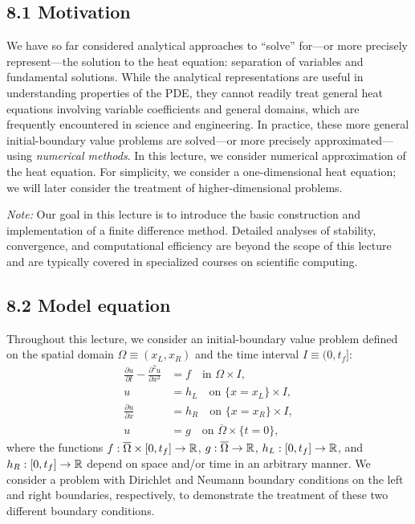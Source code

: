 
\providecommand{\uu}{\tilde{\tilde{u}}}
\providecommand{\fh}{\tilde{\hat{f}}}
\providecommand{\hh}{\tilde{\hat{h}}}


\subsection{8.1 Motivation}
We have so far considered analytical approaches to ``solve'' for---or more precisely represent---the solution to the heat equation: separation of variables and fundamental solutions. While the analytical representations are useful in understanding properties of the PDE, they cannot readily treat general heat equations involving variable coefficients and general domains, which are frequently encountered in science and engineering. In practice, these more general initial-boundary value problems are solved---or more precisely approximated---using \textit{numerical methods}. In this lecture, we consider numerical approximation of the heat equation. For simplicity, we consider a one-dimensional heat equation; we will later consider the treatment of higher-dimensional problems.

\textit{Note:} Our goal in this lecture is to introduce the basic construction and implementation of a finite difference method. Detailed analyses of stability, convergence, and computational efficiency are beyond the scope of this lecture and are typically covered in specialized courses on scientific computing.

\subsection{8.2 Model equation}
Throughout this lecture, we consider an initial-boundary value problem defined on the spatial domain $\Omega \equiv (x_L, x_R)$ and the time interval $I \equiv (0, t_f]$:
\begin{align*}
    \frac{\partial u}{\partial t} - \frac{\partial^2 u}{\partial x^2} &= f \quad \text{in } \Omega \times I, \\
    u &= h_L \quad \text{on } \{x = x_L\} \times I, \\
    \frac{\partial u}{\partial x} &= h_R \quad \text{on } \{x = x_R\} \times I, \\
    u &= g \quad \text{on } \overline{\Omega} \times \{t = 0\},
\end{align*}
where the functions $f : \overline{\Omega} \times [0, t_f] \to \mathbb{R}$, $g : \overline{\Omega} \to \mathbb{R}$, $h_L : [0, t_f] \to \mathbb{R}$, and $h_R : [0, t_f] \to \mathbb{R}$ depend on space and/or time in an arbitrary manner. We consider a problem with Dirichlet and Neumann boundary conditions on the left and right boundaries, respectively, to demonstrate the treatment of these two different boundary conditions.

